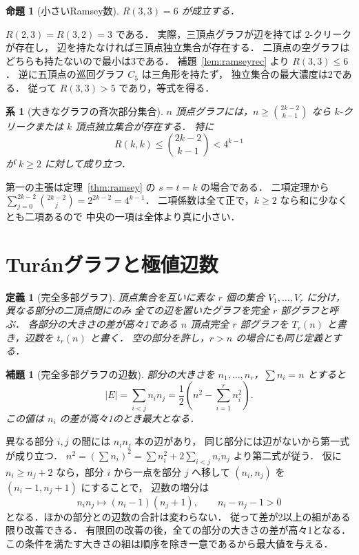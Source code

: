 \documentclass[a5paper,10pt,onecolumn]{jsarticle}
\makeatletter
\theoremstyle{mathnotetheorem}
\newtheorem{definition}[theorem]{定義}
\newtheorem{lemma}[theorem]{補題}
\newtheorem{proposition}[theorem]{命題}
\newtheorem{corollary}[theorem]{系}
\renewcommand{\proofname}{証明}
\renewenvironment{proof}[1][\proofname]{%
  \par\pushQED{\qed}\normalfont\topsep4\p@\@plus2\p@\relax
  \trivlist\item[\hskip\labelsep\bfseries #1]\ignorespaces
}{\popQED\endtrivlist\@endpefalse}
\makeatother
\begin{document}
\begin{proposition}[小さいRamsey数]\label{prop:r33}
$R(3,3)=6$ が成立する．
\end{proposition}
\begin{proof}
$R(2,3)=R(3,2)=3$ である．
実際，三頂点グラフが辺を持てば $2$-クリークが存在し，
辺を持たなければ三頂点独立集合が存在する．
二頂点の空グラフはどちらも持たないので最小は3である．
補題~\ref{lem:ramseyrec} より $R(3,3)\le6$．
逆に五頂点の巡回グラフ $C_5$ は三角形を持たず，
独立集合の最大濃度は2である．
従って $R(3,3)>5$ であり，等式を得る．
\end{proof}

\begin{corollary}[大きなグラフの斉次部分集合]
$n$ 頂点グラフには，$n\ge {2k-2\choose k-1}$ なら
$k$-クリークまたは $k$ 頂点独立集合が存在する．
特に
\[
 R(k,k)\le {2k-2\choose k-1}<4^{k-1}
\]
が $k\ge2$ に対して成り立つ．
\end{corollary}
\begin{proof}
第一の主張は定理~\ref{thm:ramsey} の $s=t=k$ の場合である．
二項定理から
$\sum_{j=0}^{2k-2}{2k-2\choose j}=2^{2k-2}=4^{k-1}$．
二項係数は全て正で，$k\ge2$ なら和に少なくとも二項あるので
中央の一項は全体より真に小さい．
\end{proof}

\section{Tur\'anグラフと極値辺数}
\begin{definition}[完全多部グラフ]
頂点集合を互いに素な $r$ 個の集合
$V_1,\ldots,V_r$ に分け，異なる部分の二頂点間にのみ
全ての辺を置いたグラフを完全 $r$ 部グラフと呼ぶ．
各部分の大きさの差が高々1である $n$ 頂点完全 $r$ 部グラフを
$T_r(n)$ と書き，辺数を $t_r(n)$ と書く．
空の部分を許し，$r>n$ の場合にも同じ定義とする．
\end{definition}

\begin{lemma}[完全多部グラフの辺数]\label{lem:multipartite}
部分の大きさを $n_1,\ldots,n_r$，$\sum n_i=n$ とすると
\begin{equation}\label{eq:multipartite}
 |E|=\sum_{i<j}n_in_j
 =\frac12\left(n^2-\sum_{i=1}^r n_i^2\right).
\end{equation}
この値は $n_i$ の差が高々1のとき最大となる．
\end{lemma}
\begin{proof}
異なる部分 $i,j$ の間には $n_in_j$ 本の辺があり，
同じ部分には辺がないから第一式が成り立つ．
$n^2=(\sum n_i)^2=\sum n_i^2+2\sum_{i<j}n_in_j$
より第二式が従う．
仮に $n_i\ge n_j+2$ なら，部分 $i$ から一点を部分 $j$ へ移して
$(n_i,n_j)$ を $(n_i-1,n_j+1)$ にすることで，
辺数の増分は
\[
 n_i n_j\longmapsto(n_i-1)(n_j+1),\qquad
 n_i-n_j-1>0
\]
となる．ほかの部分との辺数の合計は変わらない．
従って差が2以上の組がある限り改善できる．
有限回の改善の後，全ての部分の大きさの差が高々1となる．
この条件を満たす大きさの組は順序を除き一意であるから最大値を与える．
\end{proof}
\end{document}
